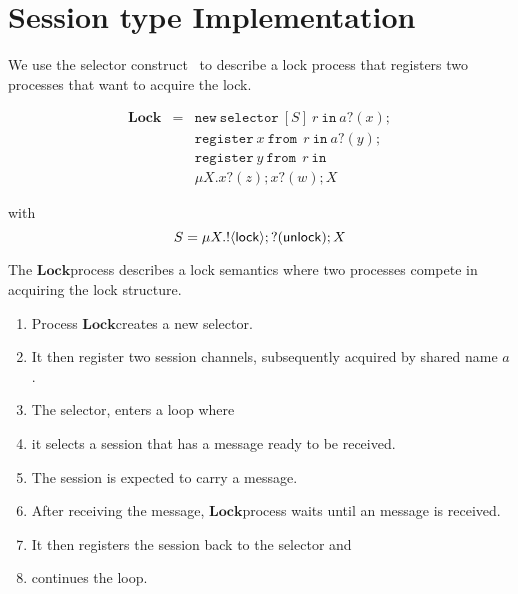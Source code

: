 \newcommand{\In}{\ensuremath{\mathtt{in}\ }}
\newcommand{\Register}{\ensuremath{\mathtt{register}\ }}
\newcommand{\Select}{\ensuremath{\mathtt{select}\ }}
\newcommand{\To}{\ensuremath{\mathtt{to}\ }}
\newcommand{\From}{\ensuremath{\mathtt{from}\ }}
\newcommand{\New}{\ensuremath{\mathtt{new}\ }}
\newcommand{\Selector}{\ensuremath{\mathtt{selector}\ }}

\newcommand{\newsel}[2]{\New \Selector[#1]\ #2\ \In}
\newcommand{\register}[2]{\Register #1\ \From\ #2\ \In}
\newcommand{\select}[2]{\Select #1\ \From\ #2\ \In}

\newcommand{\shqueue}[2]{#1[#2]}

\newcommand{\es}{\ensuremath{\epsilon}}

\newcommand{\Lock}{\ensuremath{\mathbf{Lock}}}

\newcommand{\out}[2]{\ensuremath{#1!\langle #2 \rangle;}}
\newcommand{\inp}[2]{\ensuremath{#1?(#2);}}
\newcommand{\Par}{|}


\section{Session type Implementation}
\label{sec:scribble}

We use the selector construct~\cite{KouzapasYHH13}
to describe a lock process that registers two processes that
want to acquire the lock.

\begin{eqnarray*}
	\Lock &=& \newsel{S}{r} \inp{a}{x} \\
	& & \register{x}{r} \inp{a}{y} \\
	& & \register{y}{r} \\
	& & \mu X. \inp{x}{z} \inp{x}{w} X
\end{eqnarray*}

with
\[
  S = \mu X. !\langle \mathsf{lock} \rangle; ?(\mathsf{unlock}); X
\]

The \Lock process describes a lock semantics where two
processes compete in acquiring the lock structure.

\begin{enumerate}
	\item	Process \Lock creates a new selector.
	\item	It then register two session channels, subsequently acquired by shared name $a$.
	\item	The selector, enters a loop where
	\item	it selects a session that has a message ready to be received.
	\item	The session is expected to carry a \lock message.
	\item	After receiving the message, \Lock process waits until an \unlock message is received.
	\item	It then registers the session back to the selector and
	\item	continues the loop.
\end{enumerate}


